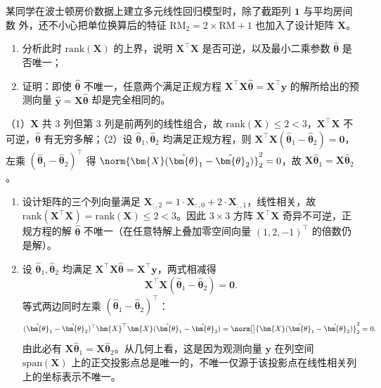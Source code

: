 \begin{exercise}[title={设计矩阵线性相关性与正规方程唯一性},level=standard,points=12,tags={正规方程,矩阵秩,多重共线性}]
某同学在波士顿房价数据上建立多元线性回归模型时，除了截距列 $\bm{1}$ 与平均房间数  外，还不小心把单位换算后的特征 $\text{RM}_2 = 2\times \text{RM} + 1$ 也加入了设计矩阵 $\bm{X}$。
\begin{enumerate}
  \item 分析此时 $\mathrm{rank}(\bm{X})$ 的上界，说明 $\bm{X}^\top\bm{X}$ 是否可逆，以及最小二乘参数 $\hat{\bm{\theta}}$ 是否唯一；
  \item 证明：即使 $\hat{\bm{\theta}}$ 不唯一，任意两个满足正规方程 $\bm{X}^\top\bm{X}\hat{\bm{\theta}} = \bm{X}^\top\bm{y}$ 的解所给出的预测向量 $\hat{\bm{y}} = \bm{X}\hat{\bm{\theta}}$ 却是完全相同的。
\end{enumerate}
\begin{answer}
（1）$\bm{X}$ 共 $3$ 列但第 $3$ 列是前两列的线性组合，故 $\mathrm{rank}(\bm{X}) \le 2 < 3$，$\bm{X}^\top\bm{X}$ 不可逆，$\hat{\bm{\theta}}$ 有无穷多解；（2）设 $\hat{\bm{\theta}}_1, \hat{\bm{\theta}}_2$ 均满足正规方程，则 $\bm{X}^\top\bm{X}(\hat{\bm{\theta}}_1 - \hat{\bm{\theta}}_2) = \bm{0}$，左乘 $(\hat{\bm{\theta}}_1 - \hat{\bm{\theta}}_2)^\top$ 得 $\norm{\bm{X}(\hat{\bm{\theta}}_1 - \hat{\bm{\theta}}_2)}_2^2 = 0$，故 $\bm{X}\hat{\bm{\theta}}_1 = \bm{X}\hat{\bm{\theta}}_2$。
\end{answer}
\begin{solution}
\begin{enumerate}
  \item 设计矩阵的三个列向量满足 $\bm{X}_{:,2} = 1\cdot\bm{X}_{:,0} + 2\cdot\bm{X}_{:,1}$，线性相关，故 $\mathrm{rank}(\bm{X}^\top\bm{X}) = \mathrm{rank}(\bm{X}) \le 2 < 3$。因此 $3\times 3$ 方阵 $\bm{X}^\top\bm{X}$ 奇异不可逆，正规方程的解 $\hat{\bm{\theta}}$ 不唯一（在任意特解上叠加零空间向量 $(1, 2, -1)^\top$ 的倍数仍是解）。
  \item 设 $\hat{\bm{\theta}}_1, \hat{\bm{\theta}}_2$ 均满足 $\bm{X}^\top\bm{X}\hat{\bm{\theta}} = \bm{X}^\top\bm{y}$，两式相减得
  \[
    \bm{X}^\top\bm{X}(\hat{\bm{\theta}}_1 - \hat{\bm{\theta}}_2) = \bm{0}.
  \]
  等式两边同时左乘 $(\hat{\bm{\theta}}_1 - \hat{\bm{\theta}}_2)^\top$：
  \[
    (\hat{\bm{\theta}}_1 - \hat{\bm{\theta}}_2)^\top \bm{X}^\top\bm{X}(\hat{\bm{\theta}}_1 - \hat{\bm{\theta}}_2)
    = \norm[\big]{\bm{X}(\hat{\bm{\theta}}_1 - \hat{\bm{\theta}}_2)}_2^2 = 0.
  \]
  由此必有 $\bm{X}\hat{\bm{\theta}}_1 = \bm{X}\hat{\bm{\theta}}_2$。从几何上看，这是因为观测向量 $\bm{y}$ 在列空间 $\mathrm{span}(\bm{X})$ 上的正交投影点总是唯一的，不唯一仅源于该投影点在线性相关列上的坐标表示不唯一。
\end{enumerate}
\end{solution}
\end{exercise}

